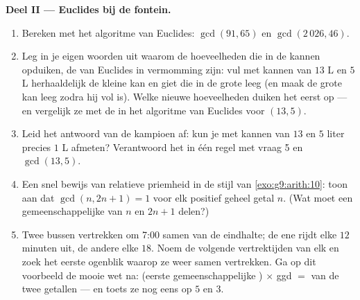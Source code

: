 \begin{problem}
\medskip
\noindent\textbf{Deel II --- Euclides bij de fontein.}
\begin{enumerate}[resume]
  \item Bereken met het algoritme van Euclides: $\gcd(91, 65)$ en
        $\gcd(2\,026, 46)$.
  \item Leg in je eigen woorden uit waarom de hoeveelheden die in de kannen
        opduiken, de  van Euclides in vermomming zijn: vul met kannen van
        $13$ L en $5$ L herhaaldelijk de kleine kan en giet die in de grote leeg
        (en maak de grote kan leeg zodra hij vol is). Welke nieuwe hoeveelheden
        duiken het eerst op --- en vergelijk ze met de  in het algoritme van
        Euclides voor $(13, 5)$.
  \item Leid het antwoord van de kampioen af: kun je met kannen van $13$ en $5$
        liter precies $1$ L afmeten? Verantwoord het in één regel met vraag 5 en
        $\gcd(13, 5)$.
  \item Een snel bewijs van relatieve priemheid in de stijl van
        \cref{exo:g9:arith:10}: toon aan dat $\gcd(n, 2n + 1) = 1$ voor elk
        positief geheel getal $n$. (Wat moet een gemeenschappelijke  van $n$
        en $2n + 1$ delen?)
  \item Twee bussen vertrekken om 7:00 samen van de eindhalte; de ene rijdt elke
        $12$ minuten uit, de andere elke $18$. Noem de volgende vertrektijden van
        elk en zoek het eerste ogenblik waarop ze weer samen vertrekken. Ga op dit
        voorbeeld de mooie wet na: (eerste gemeenschappelijke ) $\times$
        ggd $=$  van de twee getallen --- en toets ze nog eens op $5$ en
        $3$.
\end{enumerate}


\end{problem}
